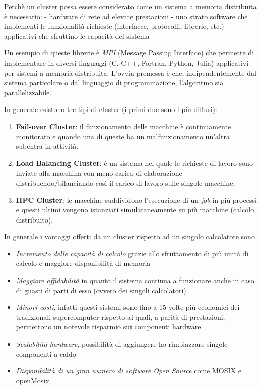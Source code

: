 Perchè un cluster possa essere considerato come un sistema a memoria
distribuita è necessario: - hardware di rete ad elevate prestazioni -
uno strato software che implementi le funzionalità richieste
(interfacce, protocolli, librerie, etc.) - applicativi che sfruttino le
capacità del sistema

Un esempio di queste librerie è \emph{MPI} (Message Passing Interface)
che permette di implementare in diversi linguaggi (C, C++, Fortran,
Python, Julia) applicativi per sistemi a memoria distribuita. L'ovvia
premessa è che, indipendentemente dal sistema particolare o dal
linguaggio di programmazione, l'algoritmo sia parallelizzabile.

In generale esistono tre tipi di cluster (i primi due sono i più
diffusi):

\begin{enumerate}
\def\labelenumi{\arabic{enumi}.}
\tightlist
\item
  \textbf{Fail-over Cluster}: il funzionamento delle macchine è
  continuamente monitorato e quando una di queste ha un malfunzionamento
  un'altra subentra in attività.
\item
  \textbf{Load Balancing Cluster}: è un sistema nel quale le richieste
  di lavoro sono inviate alla macchina con meno carico di elaborazione
  distribuendo/bilanciando così il carico di lavoro sulle singole
  macchine.
\item
  \textbf{HPC Cluster}: le macchine suddividono l'esecuzione di un
  \emph{job} in più processi e questi ultimi vengono istanziati
  simulataneamente su più macchine (calcolo distribuito).
\end{enumerate}

In generale i vantaggi offerti da un cluster rispetto ad un singolo
calcolatore sono

\begin{itemize}
\tightlist
\item
  \emph{Incremento delle capacità di calcolo} grazie allo sfruttamento
  di più unità di calcolo e maggiore disponibilità di memoria
\item
  \emph{Maggiore affidabilità} in quanto il sistema continua a
  funzionare anche in caso di guasti di parti di esso (ovvero dei
  singoli calcolatori)
\item
  \emph{Minori costi}, infatti questi sistemi sono fino a 15 volte più
  economici dei tradizionali supercomputer rispetto ai quali, a parità
  di prestazioni, permettono un notevole risparmio sui componenti
  hardware
\item
  \emph{Scalabilità hardware}, possibilità di aggiungere ho rimpiazzare
  singole componenti a caldo
\item
  \emph{Disponibilità di un gran numero di software Open Source} come
  MOSIX e openMosix.
\end{itemize}

